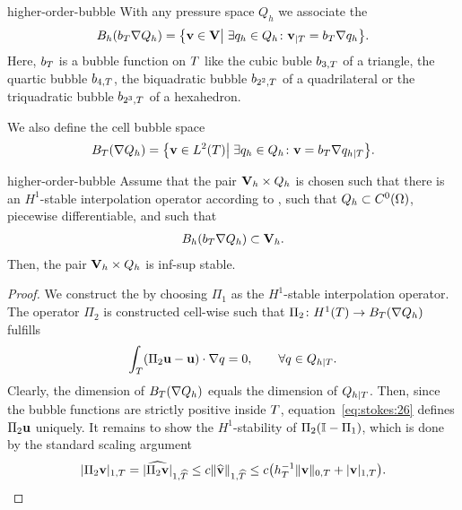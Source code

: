 \begin{Definition}{higher-order-bubble}
  With any pressure space $Q_h$ we associate the 
  \begin{gather}
    \label{eq:stokes:24}
    B_h(b_T \nabla Q_h)
    = \bigl\{ \mathbf v\in \mathbf V \big\vert
    \; \exists q_h\in Q_h \colon \mathbf v_{|T} = b_T \nabla q_h \bigr\}.
  \end{gather}
  Here, $b_T$ is a bubble function on $T$ like the cubic buble
  $b_{3,T}$ of a triangle, the quartic bubble $b_{4,T}$, the
  biquadratic bubble $b_{2^2,T}$ of a quadrilateral or the
  triquadratic bubble $b_{2^3,T}$ of a hexahedron.

  We also define the cell bubble space
  \begin{gather}
    \label{eq:stokes:25}
    B_T(\nabla Q_h) = \bigl\{ \mathbf v\in L^2(T) \big\vert
    \;\exists q_h\in Q_h \colon \mathbf v = b_T \nabla q_{h|T}\bigr\}.
  \end{gather}
\end{Definition}

\begin{Theorem}{higher-order-bubble}
  Assume that the pair $\mathbf V_h\times Q_h$ is chosen such that there is
  an $H^1$-stable interpolation operator according to
  , such that $Q_h\subset
  C^0(\Omega)$, piecewise differentiable, and such that
  \begin{gather}
    B_h(b_T \nabla Q_h) \subset \mathbf V_h.
  \end{gather}
  Then, the pair $\mathbf V_h\times Q_h$ is inf-sup stable.
\end{Theorem}

\begin{proof}
  We construct the  by
   choosing $\Pi_1$ as the
  $H^1$-stable interpolation operator. The operator $\Pi_2$ is
  constructed cell-wise such that $\Pi_2\colon H^1(T) \to
  B_T(\nabla Q_h)$ fulfills
  \begin{gather}
    \label{eq:stokes:26}
    \int_T (\Pi_2 \mathbf u - \mathbf u) \cdot\nabla q = 0,
    \qquad
    \forall q\in Q_{h|T}.
  \end{gather}
  Clearly, the dimension of $B_T(\nabla Q_h)$ equals the dimension
  of $Q_{h|T}$. Then, since the bubble functions are strictly
  positive inside $T$, equation~\eqref{eq:stokes:26} defines
  $\Pi_2 \mathbf u$ uniquely. It remains to show the $H^1$-stability of
  $\Pi_2(\mathbb I-\Pi_1)$, which is done by the standard scaling
  argument
  \begin{gather}
    \lvert\Pi_2 \mathbf v\rvert_{1,T}
    =\lvert\widehat{\Pi_2 \mathbf v}\rvert_{1,\widehat{T}}
    \le c \lVert\widehat {\mathbf v}\rVert_{1,\widehat{T}}
    \le c \bigl(h_T^{-1} \lVert\mathbf v\rVert_{0,T} + \lvert\mathbf v\rvert_{1,T}\bigr).
  \end{gather}
\end{proof}

